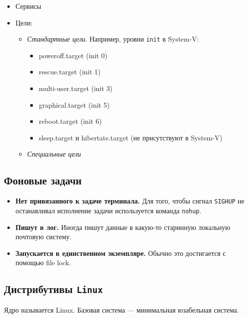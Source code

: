 \begin{multicols}{2}
      \begin{itemize}
        \item Сервисы
        \item Цели:
          \begin{itemize}
            \item \textit{Стандартные цели}. Например, уровни \texttt{init} в System-V:
              \begin{itemize}
                \item poweroff.target (init 0)
                \item rescue.target (init 1)
                \item multi-user.target (init 3)
                \item graphical.target (init 5)
                \item reboot.target (init 6)
                \item sleep.target и hibertate.target (не присутствуют в System-V)
              \end{itemize}
            \item \textit{Специальные цели}
          \end{itemize}
      \end{itemize}

      \subsection*{Фоновые задачи}

      \begin{itemize}
        \item \textbf{Нет привязанного к задаче терминала.} Для того, чтобы сигнал \texttt{SIGHUP}
        не останавливал исполнение задачи используется команда \texttt{nohup}.
        \item \textbf{Пишут в лог.} Иногда пишут данные в какую-то старинную 
        локальную почтовую систему.
        \item \textbf{Запускается в единственном экземпляре.} Обычно это достигается
        с помощью file lock.
      \end{itemize}

      \subsection*{Дистрибутивы \texttt{Linux}}

      Ядро называется Linux. Базовая система --- минимальная юзабельная система.


\end{multicols}
